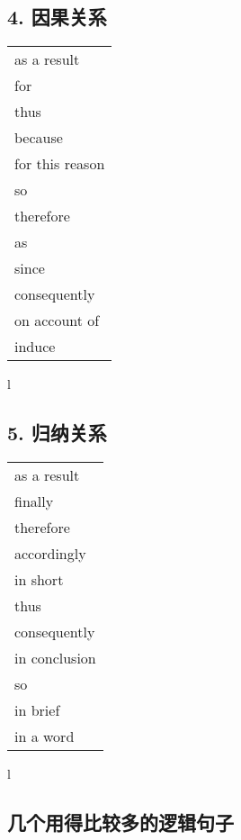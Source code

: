 \subsection{4. 因果关系}

\begin{tabular}{l}
    as a result     \\
    for             \\
    thus            \\
    because         \\
    for this reason \\
    so              \\
    therefore       \\
    as              \\
    since           \\
    consequently    \\
    on account of   \\
    induce          \\
\end{tabular}{l}

\subsection{5. 归纳关系}

\begin{tabular}{l}
    as a result   \\
    finally       \\
    therefore     \\
    accordingly   \\
    in short      \\
    thus          \\
    consequently  \\
    in conclusion \\
    so            \\
    in brief      \\
    in a word     \\
\end{tabular}{l}

\subsection{几个用得比较多的逻辑句子}

